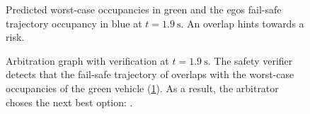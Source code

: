 %
%

\begin{figure}[!t]
    \centering
    
    \caption{
        Predicted worst-case occupancies in green and
        the egos fail-safe trajectory occupancy in blue
        at $t=\SI{1.9}{\second}$.
        An overlap hints towards a risk.
    }
    \label{fig:experiments-safe-occupancies}
\end{figure}

\begin{figure}[!t]
    \centering
    
    \caption{
        Arbitration graph with verification at $t=\SI{1.9}{\second}$.
        The safety verifier detects that the fail-safe trajectory of 
        overlaps with the worst-case occupancies of the green vehicle
        (\cref{fig:experiments-safe-occupancies}).
        As a result, the  arbitrator choses the next best option: .
    }
    \label{fig:experiments-safe-arbitration-graph}
\end{figure}
